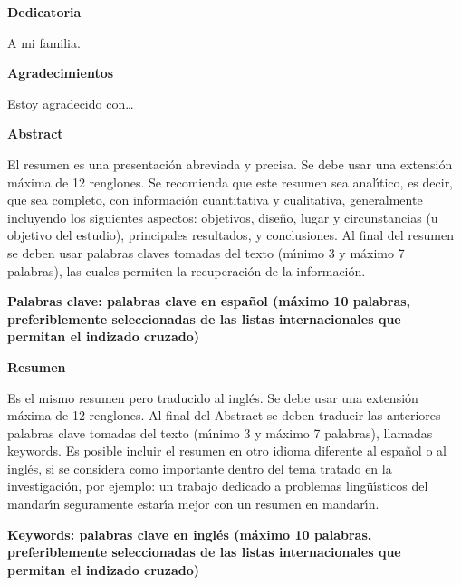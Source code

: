 \newpage

\thispagestyle{empty}

\vspace*{1cm}

\textbf{\LARGE Dedicatoria}\vspace*{4.0cm}

\begin{flushright}
\begin{minipage}{8cm}
A mi familia.
\end{minipage}
\end{flushright}

\newpage{\pagestyle{empty}\cleardoublepage}

\newpage

\thispagestyle{empty}

\vspace*{1cm}

\textbf{\LARGE Agradecimientos}\vspace*{1.0cm}

Estoy agradecido con\ldots

\newpage{\pagestyle{empty}\cleardoublepage}

\newpage

\vspace*{1cm}

\textbf{\LARGE Abstract}\vspace*{1cm}

El resumen es una presentaci\'{o}n abreviada y precisa. Se debe usar una extensi\'{o}n m\'{a}xima de 12 renglones. Se recomienda que este resumen sea anal\'{\i}tico, es decir, que sea completo, con informaci\'{o}n cuantitativa y cualitativa, generalmente incluyendo los siguientes aspectos: objetivos, dise\~{n}o, lugar y circunstancias (u objetivo del estudio), principales resultados, y conclusiones. Al final del resumen se deben usar palabras claves tomadas del texto (m\'{\i}nimo 3 y m\'{a}ximo 7 palabras), las cuales permiten la recuperaci\'{o}n de la informaci\'{o}n.\vspace*{0.5cm}

\textbf{\small Palabras clave: palabras clave en espa\~{n}ol (m\'{a}ximo 10 palabras, preferiblemente seleccionadas de las listas internacionales que permitan el indizado cruzado)}\vspace*{1cm}

\textbf{\LARGE Resumen}\vspace*{1cm}

Es el mismo resumen pero traducido al ingl\'{e}s. Se debe usar una extensi\'{o}n m\'{a}xima de 12 renglones. Al final del Abstract se deben traducir las anteriores palabras clave tomadas del texto (m\'{\i}nimo 3 y m\'{a}ximo 7 palabras), llamadas keywords. Es posible incluir el resumen en otro idioma diferente al espa\~{n}ol o al ingl\'{e}s, si se considera como importante dentro del tema tratado en la investigaci\'{o}n, por ejemplo: un trabajo dedicado a problemas ling\"{u}\'{\i}sticos del mandar\'{\i}n seguramente estar\'{\i}a mejor con un resumen en mandar\'{\i}n.\vspace*{0.5cm}

\textbf{\small Keywords: palabras clave en ingl\'{e}s (m\'{a}ximo 10 palabras, preferiblemente seleccionadas de las listas internacionales que permitan el indizado cruzado)}

\newpage{\pagestyle{empty}\cleardoublepage}